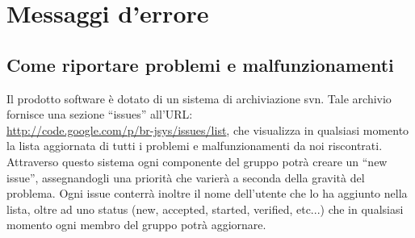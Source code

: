 \chapter{Messaggi d'errore}
\section{Come riportare problemi e malfunzionamenti}
Il prodotto software \`e dotato di un sistema di archiviazione svn. Tale archivio fornisce una sezione ``issues'' all'URL: \\ 
\href{http://code.google.com/p/br-jsys/issues/list}{http://code.google.com/p/br-jsys/issues/list}, che visualizza in qualsiasi momento la lista aggiornata di tutti i problemi e malfunzionamenti da noi riscontrati. Attraverso questo sistema ogni componente del gruppo potr\`a creare un ``new issue'', assegnandogli una priorit\`a che varier\`a a seconda della gravit\`a del problema. Ogni issue conterr\`a inoltre il nome dell'utente che lo ha aggiunto nella lista, oltre ad uno status (new, accepted, started, verified, etc...) che in qualsiasi momento ogni membro del gruppo potr\`a aggiornare. 


